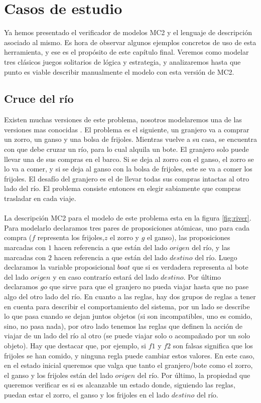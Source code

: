 \chapter{Casos de estudio}

Ya hemos presentado el verificador de modelos MC2 y el lenguaje de descripción asociado al mismo. Es hora de observar algunos ejemplos concretos de uso de esta herramienta, y ese es el propósito de este capítulo final. Veremos como modelar tres clásicos juegos solitarios de lógica y estrategia, y analizaremos hasta que punto es viable describir manualmente el modelo con esta versión de MC2.

\section{Cruce del río}

Existen muchas versiones de este problema, nosotros modelaremos una de las versiones mas conocidas \cite{Hadley:12}. El problema es el siguiente, un granjero va a comprar un zorro, un ganso y una bolsa de frijoles. Mientras vuelve a su casa, se encuentra con que debe cruzar un río, para lo cual alquila un bote. El granjero solo puede llevar una de sus compras en el barco. Si se deja al zorro con el ganso, el zorro se lo va a comer, y si se deja al ganso con la bolsa de frijoles, este se va a comer los frijoles. El desafío del granjero es el de llevar todas sus compras intactas al otro lado del río. El problema consiste entonces en elegir sabiamente que compras trasladar en cada viaje.\\
\\
La descripción MC2 para el modelo de este problema esta en la figura \ref{fig:river}. Para modelarlo declaramos tres pares de proposiciones atómicas, uno para cada compra ($f$ representa los frijoles,$z$ el zorro y $g$ el ganso), las proposiciones marcadas con $1$ hacen referencia a que están del lado $origen$ del río, y las marcadas con $2$ hacen referencia a que están del lado $destino$ del río. Luego declaramos la variable proposicional $boat$ que si es verdadera representa al bote del lado $origen$ y en caso contrarío estará del lado $destino$. Por último declaramos $go$ que sirve para que el granjero no pueda viajar hasta que no pase algo del otro lado del río. En cuanto a las reglas, hay dos grupos de reglas a tener en cuenta para describir el comportamiento del sistema, por un lado se describe lo que pasa cuando se dejan juntos objetos (si son incompatibles, uno es comido, sino, no pasa nada), por otro lado tenemos las reglas que definen la acción de viajar de un lado del río al otro (se puede viajar solo o acompañado por un solo objeto). Hay que destacar que, por ejemplo, si $f1$ y $f2$ son falsas significa que los frijoles se han comido, y ninguna regla puede cambiar estos valores. En este caso, en el estado inicial queremos que valga que tanto el granjero/bote como el zorro, el ganso y los frijoles están del lado $origen$ del río. Por último, la propiedad que queremos verificar es si es alcanzable un estado donde, siguiendo las reglas, puedan estar el zorro, el ganso y los frijoles en el lado $destino$ del río.

